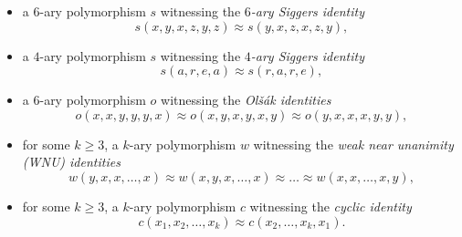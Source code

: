 \documentclass[a4paper,reqno, cleveref]{amsart}
\begin{document}
\begin{itemize} 
    \item a $6$-ary  polymorphism $s$ witnessing the \emph{$6$-ary Siggers identity}~\cite{Siggers} 
        \begin{equation}\label{eq:identity1}
            s(x, y, x, z, y, z) \approx s(y, x, z, x, z, y)  ,
        \end{equation}
    \item a $4$-ary  polymorphism $s$ witnessing the \emph{$4$-ary Siggers identity}~\cite{KearnesMarkovicMcKenzie} 
        \begin{equation}\label{eq:identity2}
            s(a, r, e, a) \approx s(r, a, r, e),
        \end{equation}
    \item a $6$-ary polymorphism $o$ witnessing the \emph{Ol\v{s}\'ak identities}~\cite{olsak-idempotent}
        \begin{equation}\label{eq:identity5}
            o (x, x, y, y, y, x) \approx o(x,y,x,y,x,y)\approx o(y,x,x,x,y,y) , 
        \end{equation}
        \item for some $k\geq 3$, a $k$-ary polymorphism $w$ witnessing the \emph{weak near unanimity (WNU) identities}~\cite{MarotiMcKenzie} \begin{equation}\label{eq:identity3}
            w(y, x, x, \dots, x) \approx w(x, y, x, \dots, x) \approx \dots \approx w(x, x, \dots, x, y),
        \end{equation}
    \item for some $k\geq 3$, a $k$-ary polymorphism $c$ witnessing the \emph{cyclic identity}~\cite{Cyclic}
        \begin{equation}\label{eq:identity4}
            c(x_1, x_2, \dots, x_k) \approx c(x_2, \dots, x_k, x_1).
        \end{equation}
\end{itemize}
\end{document}

